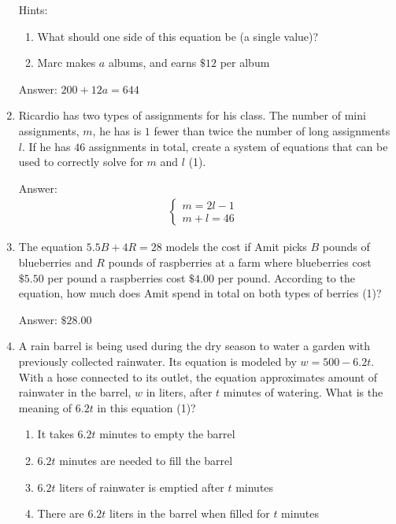 \documentclass{article}
\begin{document}
\begin{enumerate}
{	      Hints:
	      \begin{enumerate}
		      \item {What should one side of this equation be (a single value)?}
		      \item {Marc makes $a$ albums, and earns $\$12$ per album}
	      \end{enumerate}

	      Answer: \(200+12a=644\)
	      }
	\item {
	      Ricardio has two types of assignments for his class. The number of mini assignments, $m$, he has is $1$ fewer than twice the number of long assignments $l$. If he has $46$ assignments in total, create a system of equations that can be used to correctly solve for $m$ and $l$ (1).

	      Answer:
	      \[
		      \begin{array}{l}
			      \begin{cases}
				      m=2l-1 & \\
				      m+l=46
			      \end{cases}
		      \end{array}
	      \]
	      }
	\item {The equation \(5.5B+4R=28\) models the cost if Amit picks $B$ pounds of blueberries and $R$ pounds of raspberries at a farm where blueberries cost $\$5.50$ per pound a raspberries cost $\$4.00$ per pound. According to the equation, how much does Amit spend in total on both types of berries (1)?

		      Answer: $\$28.00$}
	\item {A rain barrel is being used during the dry season to water a garden with previously collected rainwater. Its equation is modeled by \( w=500-6.2t \). With a hose connected to its outlet, the equation approximates amount of rainwater in the barrel, $w$ in liters, after $t$ minutes of watering. What is the meaning of $6.2t$ in this equation (1)?

	      \begin{enumerate}
		      \item {It takes $6.2t$ minutes to empty the barrel}
		      \item{$6.2t$ minutes are needed to fill the barrel}
		      \item{$6.2t$ liters of rainwater is emptied after $t$ minutes}
		      \item{There are $6.2t$ liters in the barrel when filled for $t$ minutes}
	      \end{enumerate}

}
\end{enumerate}
\end{document}
